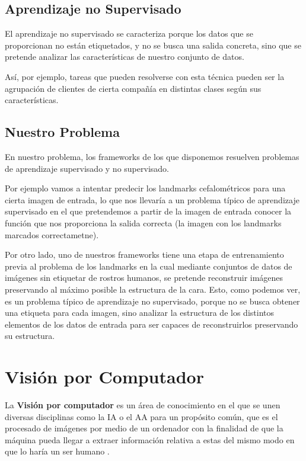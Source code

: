     \subsection{Aprendizaje no Supervisado}
            \noindent El aprendizaje no supervisado se caracteriza porque los datos que se proporcionan no están etiquetados, y no se busca una salida concreta, sino que se pretende analizar las características de nuestro conjunto de datos. 

            Así, por ejemplo, tareas que pueden resolverse con esta técnica pueden ser la agrupación de clientes de cierta compañía en distintas clases según sus características.
            
    \subsection{Nuestro Problema}
        \noindent En nuestro problema, los frameworks de los que disponemos resuelven problemas de aprendizaje supervisado y no supervisado. 
        
        \medskip
        
        \noindent Por ejemplo vamos a intentar predecir los landmarks cefalométricos para una cierta imagen de entrada, lo que nos llevaría a un problema típico de aprendizaje supervisado en el que pretendemos a partir de la imagen de entrada conocer la función que nos proporciona la salida correcta (la imagen con los landmarks marcados correctametne).

        \medskip

        \noindent Por otro lado, uno de nuestros frameworks tiene una etapa de entrenamiento previa al problema de los landmarks en la cual mediante conjuntos de datos de imágenes sin etiquetar de rostros humanos, se pretende reconstruir imágenes preservando al máximo posible la estructura de la cara. Esto, como podemos ver, es un problema típico de aprendizaje no supervisado, porque no se busca obtener una etiqueta para cada imagen, sino analizar la estructura de los distintos elementos de los datos de entrada para ser capaces de reconstruirlos preservando su estructura.

\section{Visión por Computador}
    \noindent La \textbf{Visión por computador} es un área de conocimiento en el que se unen diversas disciplinas como la IA o el AA para un propósito común, que es el procesado de imágenes por medio de un ordenador con la finalidad de que la máquina pueda llegar a extraer información relativa a estas del mismo modo en que lo haría un ser humano \cite{rosenfeld1988computer}. 

